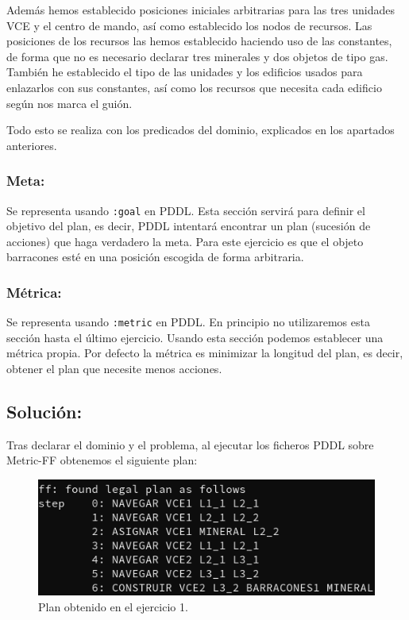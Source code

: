 \documentclass[10pt, spanish]{article}
\begin{document}
Además hemos establecido posiciones iniciales arbitrarias para las tres unidades VCE y el centro de mando, así como establecido los nodos de recursos. Las posiciones de los recursos las hemos establecido haciendo uso de las constantes, de forma que no es necesario declarar tres minerales y dos objetos de tipo gas. También he establecido el tipo de las unidades y los edificios usados para enlazarlos con sus constantes, así como los recursos que necesita cada edificio según nos marca el guión.

Todo esto se realiza con los predicados del dominio, explicados en los apartados anteriores.

\subsubsection{Meta:}

Se representa usando \texttt{:goal} en PDDL. Esta sección servirá para definir el objetivo del plan, es decir, PDDL intentará encontrar un plan (sucesión de acciones) que haga verdadero la meta. Para este ejercicio es que el objeto barracones esté en una posición escogida de forma arbitraria.

\subsubsection{Métrica:}

Se representa usando \texttt{:metric} en PDDL. En principio no utilizaremos esta sección hasta el último ejercicio. Usando esta sección podemos establecer una métrica propia. Por defecto la métrica es minimizar la longitud del plan, es decir, obtener el plan que necesite menos acciones.


\subsection{Solución:}

Tras declarar el dominio y el problema, al ejecutar los ficheros PDDL sobre Metric-FF obtenemos el siguiente plan:

\begin{figure}[H]
	\centering
	\includegraphics[scale=0.4]{plan1.png}
	\caption{Plan obtenido en el ejercicio 1.}
	\label{plan1}
\end{figure}
\end{document}
